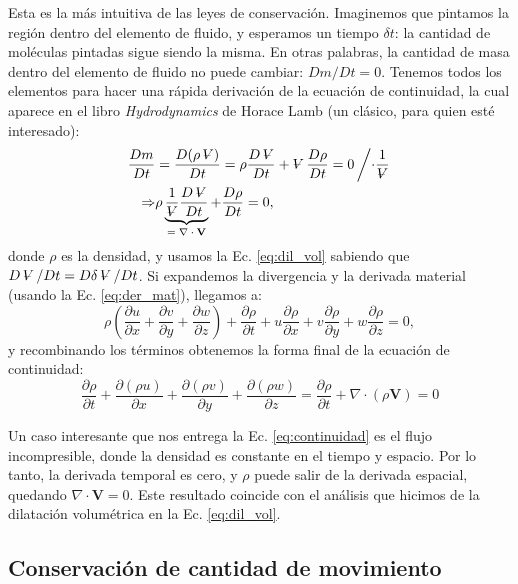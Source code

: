 Esta es la más intuitiva de las leyes de conservación. 
Imaginemos que pintamos la región dentro del elemento de fluido, y esperamos un tiempo $\delta t$: la cantidad de moléculas pintadas sigue siendo la misma.
En otras palabras, la cantidad de masa dentro del elemento de fluido no puede cambiar: $Dm/Dt=0$.
Tenemos todos los elementos para hacer una rápida derivación de la ecuación de continuidad, la cual aparece en el libro \emph{Hydrodynamics} de Horace Lamb (un clásico, para quien esté interesado):
%
\begin{align}
\frac{Dm}{Dt} &= \frac{D(\rho\vol)}{Dt} = \rho\frac{D\vol}{Dt} + \vol\frac{D\rho}{Dt} = 0 \left/\cdot\frac{1}{\vol}\right. \nonumber \\
\Rightarrow & \rho \underbrace{\frac{1}{\vol}\frac{D\vol}{Dt}}_\text{$=\nabla\cdot\mathbf{V}$} + \frac{D\rho}{Dt} = 0,
\end{align}
%
donde $\rho$ es la densidad, y usamos la Ec. \eqref{eq:dil_vol} sabiendo que $D\vol/Dt=D\delta\vol/Dt$. 
Si expandemos la divergencia y la derivada material (usando la Ec. \eqref{eq:der_mat}), llegamos a:
%
\begin{equation}
\rho\left(\frac{\partial u}{\partial x} + \frac{\partial v}{\partial y} + \frac{\partial w}{\partial z}\right) + \frac{\partial \rho}{\partial t} + u\frac{\partial \rho}{\partial x} + v\frac{\partial \rho}{\partial y} +w\frac{\partial \rho}{\partial z} = 0,
\end{equation}
%
y recombinando los términos obtenemos la forma final de la ecuación de continuidad:
%
\begin{equation}\label{eq:continuidad}
\frac{\partial \rho}{\partial t} + \frac{\partial (\rho u)}{\partial x} + \frac{\partial (\rho v)}{\partial y} + \frac{\partial (\rho w)}{\partial z} = \frac{\partial \rho}{\partial t} + \nabla\cdot(\rho\mathbf{V})= 0
\end{equation}

Un caso interesante que nos entrega la Ec. \eqref{eq:continuidad} es el flujo incompresible, donde la densidad es constante en el tiempo y espacio. 
Por lo tanto, la derivada temporal es cero, y $\rho$ puede salir de la derivada espacial, quedando $\nabla\cdot\mathbf{V}=0$.
Este resultado coincide con el análisis que hicimos de la dilatación volumétrica en la Ec. \eqref{eq:dil_vol}.

\subsection*{Conservación de cantidad de movimiento}

